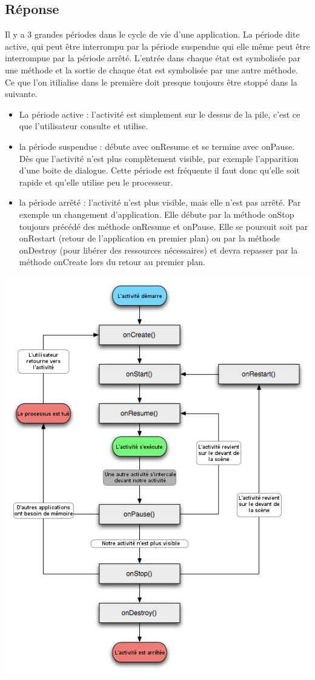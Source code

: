 \documentclass[francais,12pt]{article}
\begin{document}
		\subsection*{Réponse}
		Il y a 3 grandes périodes dans le cycle de vie d'une application. La période dite active, qui peut être interrompu par la période
		suspendue qui elle même peut être interrompue par la période arrêté.
		L'entrée dans chaque état est symbolisée par une méthode et la sortie de chaque état est symbolisée par une autre méthode. Ce que l'on itilialise dans le première doit presque toujours être stoppé dans la suivante.
		
		\begin{itemize}
			\item La période active : l'activité est simplement sur le dessus de la pile, c'est ce que l'utilisateur consulte et utilise. 
			\item la période suspendue : débute avec onResume et se termine avec onPause. Dès que l'activité n'est plus complètement visible, par exemple l'apparition d'une boite de dialogue. Cette période est fréquente il faut donc qu'elle soit rapide et qu'elle utilise peu le processeur.
			\item la période arrêté : l'activité n'est plus visible, mais elle n'est pas arrêté. Par exemple un changement d'application. Elle débute par la méthode onStop toujours précédé des méthode onResume et onPause. Elle se poursuit soit par onRestart (retour de l'application en premier plan) ou par la méthode onDestroy (pour libérer des ressources nécessaires) et devra repasser par la méthode onCreate lors du retour au premier plan.
		\end{itemize}
		
		\begin{center}
			\includegraphics[width=0.6\linewidth]{images/cycleVie}
		\end{center}
	\newpage
		
\end{document}
